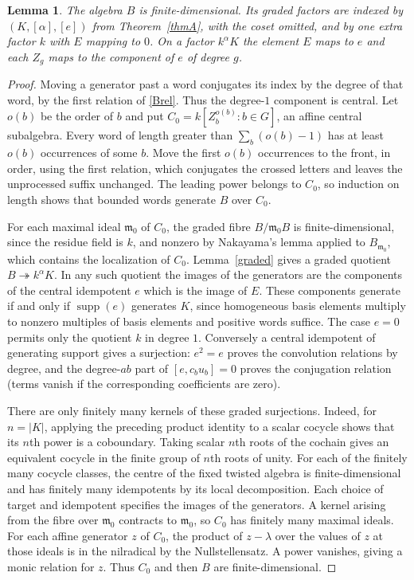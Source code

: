 \documentclass[11pt]{amsart}
\newtheorem{lemma}{Lemma}[section]
\theoremstyle{definition}
\newcommand{\supp}{\operatorname{supp}}
\begin{document}
\begin{lemma}\label{finite}
The algebra $B$ is finite-dimensional. Its graded factors are indexed by $(K,[\alpha],[e])$ from Theorem~\ref{thmA}, with the coset omitted, and by one extra factor $k$ with $E$ mapping to $0$. On a factor $k^\alpha K$ the element $E$ maps to $e$ and each $Z_g$ maps to the component of $e$ of degree $g$.
\end{lemma}
\begin{proof}
Moving a generator past a word conjugates its index by the degree of that word, by the first relation of \eqref{Brel}. Thus the degree-$1$ component is central. Let $o(b)$ be the order of $b$ and put $C_0=k[Z_b^{o(b)}:b\in G]$, an affine central subalgebra. Every word of length greater than $\sum_b(o(b)-1)$ has at least $o(b)$ occurrences of some $b$. Move the first $o(b)$ occurrences to the front, in order, using the first relation, which conjugates the crossed letters and leaves the unprocessed suffix unchanged. The leading power belongs to $C_0$, so induction on length shows that bounded words generate $B$ over $C_0$.

For each maximal ideal $\mathfrak m_0$ of $C_0$, the graded fibre $B/\mathfrak m_0B$ is finite-dimensional, since the residue field is $k$, and nonzero by Nakayama's lemma applied to $B_{\mathfrak m_0}$, which contains the localization of $C_0$. Lemma~\ref{graded} gives a graded quotient $B\twoheadrightarrow k^\alpha K$. In any such quotient the images of the generators are the components of the central idempotent $e$ which is the image of $E$. These components generate if and only if $\supp(e)$ generates $K$, since homogeneous basis elements multiply to nonzero multiples of basis elements and positive words suffice. The case $e=0$ permits only the quotient $k$ in degree $1$. Conversely a central idempotent of generating support gives a surjection: $e^2=e$ proves the convolution relations by degree, and the degree-$ab$ part of $[e,c_bu_b]=0$ proves the conjugation relation (terms vanish if the corresponding coefficients are zero).

There are only finitely many kernels of these graded surjections. Indeed, for $n=|K|$, applying the preceding product identity to a scalar cocycle shows that its $n$th power is a coboundary. Taking scalar $n$th roots of the cochain gives an equivalent cocycle in the finite group of $n$th roots of unity. For each of the finitely many cocycle classes, the centre of the fixed twisted algebra is finite-dimensional and has finitely many idempotents by its local decomposition. Each choice of target and idempotent specifies the images of the generators. A kernel arising from the fibre over $\mathfrak m_0$ contracts to $\mathfrak m_0$, so $C_0$ has finitely many maximal ideals. For each affine generator $z$ of $C_0$, the product of $z-\lambda$ over the values of $z$ at those ideals is in the nilradical by the Nullstellensatz. A power vanishes, giving a monic relation for $z$. Thus $C_0$ and then $B$ are finite-dimensional.


\end{proof}
\end{document}
